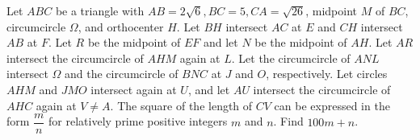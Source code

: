 Let $ABC$ be a triangle with $AB=2\sqrt6, BC=5, CA=\sqrt{26}$, midpoint $M$ of $BC$, circumcircle $\Omega$, and orthocenter $H$. Let $BH$ intersect $AC$ at $E$ and $CH$ intersect $AB$ at $F$. Let $R$ be the midpoint of $EF$ and let $N$ be the midpoint of $AH$. Let $AR$ intersect the circumcircle of $AHM$ again at $L$. Let the circumcircle of $ANL$ intersect $\Omega$ and the circumcircle of $BNC$ at $J$ and $O$, respectively. Let circles $AHM$ and $JMO$ intersect again at $U$, and let $AU$ intersect the circumcircle of $AHC$ again at $V \neq A$. The square of the length of $CV$ can be expressed in the form $\dfrac mn$ for relatively prime positive integers $m$ and $n$. Find $100m+n$.

